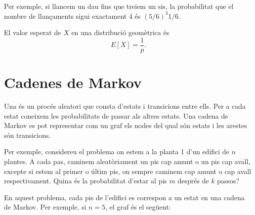 Per exemple, si llancem un dau fins que treiem un sis, la probabilitat
que el nombre de llançaments sigui exactament 4 és $(5/6)^3 1/6$.

El valor esperat de $X$ en una distribució geomètrica és
\[E[X]=\frac{1}{p}.\]


\section{Cadenes de Markov}


Una  %
és un procés aleatori que consta d'estats i transicions entre
ells. Per a cada estat coneixem les probabilitats de passar als
altres estats. Una cadena de Markov es pot representar com un graf els
nodes del qual són estats i les arestes són transicions.

Per exemple, considereu el problema on estem a la planta 1 d'un
edifici de $n$ plantes. A cada pas, caminem aleatòriament un pis cap
amunt o un pis cap avall, excepte si estem al primer o últim pis, on
sempre caminem cap amunt o cap avall respectivament. Quina és la
probabilitat d'estar al pis $m$ després de $k$ passos?

En aquest problema, cada pis de l'edifici es correspon a un estat en
una cadena de Markov. Per exemple, si $n=5$, el graf és el següent:


\begin{center}
\end{center}


